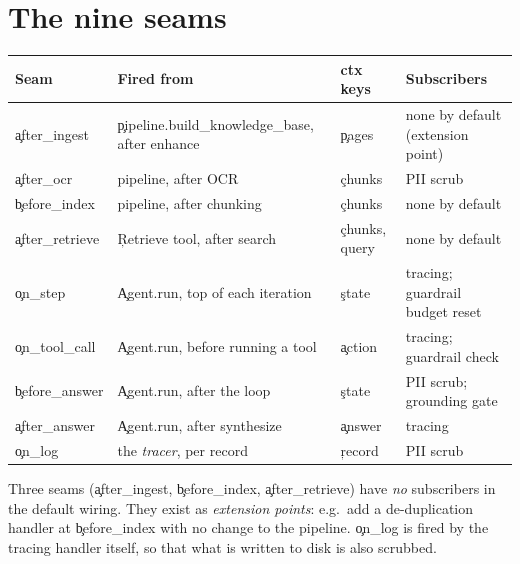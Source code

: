 \section{The nine seams}
\begin{longtable}{@{}p{3cm}p{3.7cm}p{3.4cm}p{4.2cm}@{}}
\toprule Seam & Fired from & ctx keys & Subscribers \\ \midrule \endhead
\c{after\_ingest} & \c{pipeline.build\_knowledge\_base}, after enhance & \c{pages} & none by default (extension point) \\
\c{after\_ocr} & pipeline, after OCR & \c{chunks} & PII scrub \\
\c{before\_index} & pipeline, after chunking & \c{chunks} & none by default \\
\c{after\_retrieve} & \c{Retrieve} tool, after search & \c{chunks, query} & none by default \\
\c{on\_step} & \c{Agent.run}, top of each iteration & \c{state} & tracing; guardrail budget reset \\
\c{on\_tool\_call} & \c{Agent.run}, before running a tool & \c{action} & tracing; guardrail check \\
\c{before\_answer} & \c{Agent.run}, after the loop & \c{state} & PII scrub; grounding gate \\
\c{after\_answer} & \c{Agent.run}, after synthesize & \c{answer} & tracing \\
\c{on\_log} & the \emph{tracer}, per record & \c{record} & PII scrub \\
\bottomrule\end{longtable}
\begin{tip}
Three seams (\c{after\_ingest}, \c{before\_index}, \c{after\_retrieve}) have \emph{no} subscribers in the default wiring. They exist as \emph{extension points}: e.g.\ add a de-duplication handler at \c{before\_index} with no change to the pipeline. \c{on\_log} is fired by the tracing handler itself, so that what is written to disk is also scrubbed.
\end{tip}


